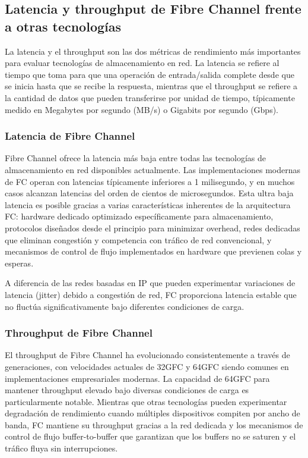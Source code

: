 \subsection{Latencia y throughput de Fibre Channel frente a otras tecnologías}

La latencia y el throughput son las dos métricas de rendimiento más importantes para evaluar tecnologías de almacenamiento en red. La latencia se refiere al tiempo que toma para que una operación de entrada/salida complete desde que se inicia hasta que se recibe la respuesta, mientras que el throughput se refiere a la cantidad de datos que pueden transferirse por unidad de tiempo, típicamente medido en Megabytes por segundo (MB/s) o Gigabits por segundo (Gbps).

\subsubsection{Latencia de Fibre Channel}

Fibre Channel ofrece la latencia más baja entre todas las tecnologías de almacenamiento en red disponibles actualmente. Las implementaciones modernas de FC operan con latencias típicamente inferiores a 1 milisegundo, y en muchos casos alcanzan latencias del orden de cientos de microsegundos. Esta ultra baja latencia es posible gracias a varias características inherentes de la arquitectura FC: hardware dedicado optimizado específicamente para almacenamiento, protocolos diseñados desde el principio para minimizar overhead, redes dedicadas que eliminan congestión y competencia con tráfico de red convencional, y mecanismos de control de flujo implementados en hardware que previenen colas y esperas.

A diferencia de las redes basadas en IP que pueden experimentar variaciones de latencia (jitter) debido a congestión de red, FC proporciona latencia estable que no fluctúa significativamente bajo diferentes condiciones de carga.

\subsubsection{Throughput de Fibre Channel}

El throughput de Fibre Channel ha evolucionado consistentemente a través de generaciones, con velocidades actuales de 32GFC y 64GFC siendo comunes en implementaciones empresariales modernas. La capacidad de 64GFC para mantener throughput elevado bajo diversas condiciones de carga es particularmente notable. Mientras que otras tecnologías pueden experimentar degradación de rendimiento cuando múltiples dispositivos compiten por ancho de banda, FC mantiene su throughput gracias a la red dedicada y los mecanismos de control de flujo buffer-to-buffer que garantizan que los buffers no se saturen y el tráfico fluya sin interrupciones.

